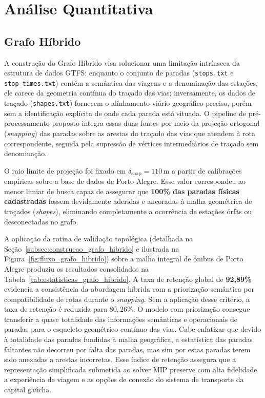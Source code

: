 \documentclass[cic,tc]{infufrgs}
\begin{document}
\section{Análise Quantitativa}
\label{sec:analise_quantitativa}

\subsection{Grafo Híbrido}
\label{subsec:analise_grafo_hibrido}

A construção do Grafo Híbrido visa solucionar uma limitação intrínseca da estrutura de dados GTFS: enquanto o conjunto de paradas (\texttt{stops.txt} e \texttt{stop\_times.txt}) contém a semântica das viagens e a denominação das estações, ele carece da geometria contínua do traçado das vias; inversamente, os dados de traçado (\texttt{shapes.txt}) fornecem o alinhamento viário geográfico preciso, porém sem a identificação explícita de onde cada parada está situada. O pipeline de pré-processamento proposto integra essas duas fontes por meio da projeção ortogonal (\textit{snapping}) das paradas sobre as arestas do traçado das vias que atendem à rota correspondente, seguida pela supressão de vértices intermediários de traçado sem denominação.

O raio limite de projeção foi fixado em $\delta_{\text{snap}} = 110\,\text{m}$ a partir de calibrações empíricas sobre a base de dados de Porto Alegre. Esse valor correspondeu ao menor limiar de busca capaz de assegurar que \textbf{100\% das paradas físicas cadastradas} fossem devidamente aderidas e ancoradas à malha geométrica de traçados (\textit{shapes}), eliminando completamente a ocorrência de estações órfãs ou desconectadas no grafo.

A aplicação da rotina de validação topológica (detalhada na Seção~\ref{subsec:construcao_grafo_hibrido} e ilustrada na Figura~\ref{fig:fluxo_grafo_hibrido}) sobre a malha integral de ônibus de Porto Alegre produziu os resultados consolidados na Tabela~\ref{tab:estatisticas_grafo_hibrido}. A taxa de retenção global de \textbf{92,89\%} evidencia a consistência da abordagem híbrida com a priorização semântica por compatibilidade de rotas durante o \textit{snapping}. Sem a aplicação desse critério, a taxa de retenção é reduzida para $80{,}26\%$. O modelo com priorização consegue transferir a quase totalidade das informações semânticas e operacionais de paradas para o esqueleto geométrico contínuo das vias. Cabe enfatizar que devido à totalidade das paradas fundidas à malha geográfica, a estatística das paradas faltantes não decorreu por falta das paradas, mas sim por estas paradas terem sido anexadas a arestas incorretas. Esse índice de retenção assegura que a representação simplificada submetida ao solver MIP preserve com alta fidelidade a experiência de viagem e as opções de conexão do sistema de transporte da capital gaúcha.
\end{document}
